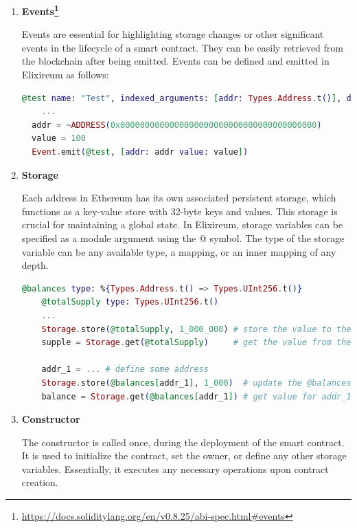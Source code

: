 \begin{enumerate}
  \item \textbf{Events\footnote{\url{https://docs.soliditylang.org/en/v0.8.25/abi-spec.html\#events}}}

  Events are essential for highlighting storage changes or other significant events in the lifecycle of a smart contract. They can be easily retrieved from the blockchain after being emitted. Events can be defined and emitted in Elixireum as follows:

  \begin{lstlisting}[caption={Events}, language=elixir, label={lst:calldata_decoding_recursive}]
  @test name: "Test", indexed_arguments: [addr: Types.Address.t()], data_arguments: [value: Types.UInt256.t()]
    ...
  addr = ~ADDRESS(0x0000000000000000000000000000000000000000)
  value = 100
  Event.emit(@test, [addr: addr value: value])
  \end{lstlisting}
  
  \item \textbf{Storage}
  
  Each address in Ethereum has its own associated persistent storage, which functions as a key-value store with 32-byte keys and values. This storage is crucial for maintaining a global state. In Elixireum, storage variables can be specified as a module argument using the @ symbol. The type of the storage variable can be any available type, a mapping, or an inner mapping of any depth.

  \begin{lstlisting}[caption={Storage}, language=elixir, label={lst:calldata_decoding_recursive}]
    @balances type: %{Types.Address.t() => Types.UInt256.t()}
    @totalSupply type: Types.UInt256.t()
    ...
    Storage.store(@totalSupply, 1_000_000) # store the value to the storage
    supple = Storage.get(@totalSupply)     # get the value from the storage
    
    addr_1 = ... # define some address
    Storage.store(@balances[addr_1], 1_000)  # update the @balances mapping for addr_1
    balance = Storage.get(@balances[addr_1]) # get value for addr_1 from @balances
  \end{lstlisting}
  
  \item \textbf{Constructor}

  The constructor is called once, during the deployment of the smart contract. It is used to initialize the contract, set the owner, or define any other storage variables. Essentially, it executes any necessary operations upon contract creation.
  

\end{enumerate}
